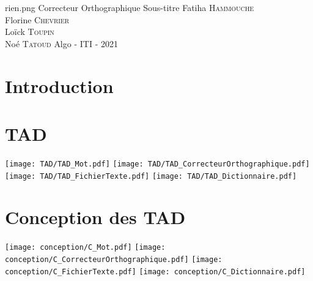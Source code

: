 \documentclass[11pt,a4paper]{article}
\begin{document}
\PageDeGarde	
{rien.png} %
{Correcteur Orthographique} %
{Sous-titre} %
{Fatiha \textsc{Hammouche} \\
Florine \textsc{Chevrier} \\
Loïck \textsc{Toupin} \\
Noé \textsc{Tatoud}}
{Algo - ITI - 2021} %



\tableofcontents

\clearpage
\section{Introduction}

\clearpage
\section{TAD}
	\texttt{[image: TAD/TAD\_Mot.pdf]}
	\newpage
	\texttt{[image: TAD/TAD\_CorrecteurOrthographique.pdf]}
	\texttt{[image: TAD/TAD\_FichierTexte.pdf]}
	\texttt{[image: TAD/TAD\_Dictionnaire.pdf]}

\clearpage
\section{Conception des TAD}
	\texttt{[image: conception/C\_Mot.pdf]}
	\texttt{[image: conception/C\_CorrecteurOrthographique.pdf]}
	\texttt{[image: conception/C\_FichierTexte.pdf]}
	\texttt{[image: conception/C\_Dictionnaire.pdf]}
\end{document}
